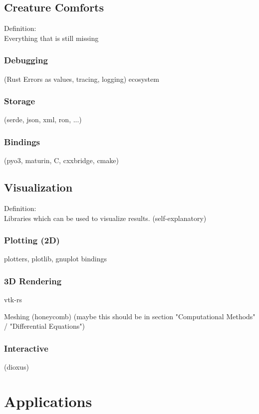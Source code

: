 \documentclass{article}
\begin{document}
\subsection{Creature Comforts}
Definition:\\
Everything that is still missing

\subsubsection{Debugging}
(Rust Errors as values, tracing, logging) ecosystem

\subsubsection{Storage}
(serde, json, xml, ron, ...)

\subsubsection{Bindings}
(pyo3, maturin, C, cxxbridge, cmake)

\subsection{Visualization}
Definition:\\
Libraries which can be used to visualize results. (self-explanatory)

\subsubsection{Plotting (2D)}
plotters, plotlib, gnuplot bindings

\subsubsection{3D Rendering}
vtk-rs

Meshing (honeycomb) (maybe this should be in section "Computational Methods" / "Differential
Equations")

\subsubsection{Interactive}
(dioxus)

\section{Applications}
\label{section:applications}
\end{document}
